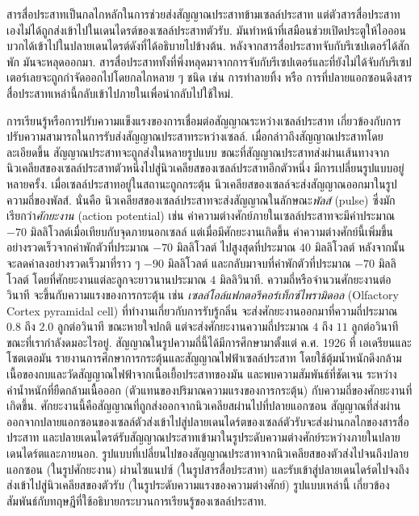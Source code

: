 {\begin{shaded}
		สารสื่อประสาทเป็นกลไกหลักในการช่วยส่งสัญญาณประสาทข้ามเซลล์ประสาท
		แต่ตัวสารสื่อประสาทเองไม่ได้ถูกส่งเข้าไปในเดนไดรต์ของเซลล์ประสาทตัวรับ.
		มันทำหน้าที่เสมือนช่วยเปิดประตูให้ไอออนบวกได้เข้าไปในปลายเดนไดรต์ดังที่ได้อธิบายไปข้างต้น.
		หลังจากสารสื่อประสาทจับกับรีเซปเตอร์ได้สักพัก มันจะหลุดออกมา.
		สารสื่อประสาททั้งที่พึ่งหลุดมาจากการจับกับรีเซปเตอร์และที่ยังไม่ได้จับกับรีเซปเตอร์เลยจะถูกกำจัดออกไปโดยกลไกหลาย ๆ ชนิด เช่น การทำลายทิ้ง หรือ การที่ปลายแอกซอนดึงสารสื่อประสาทเหล่านี้กลับเข้าไปภายในเพื่อนำกลับไปใช้ใหม่.
		
		การเรียนรู้หรือการปรับความแข็งแรงของการเชื่อมต่อสัญญาณระหว่างเซลล์ประสาท
		เกี่ยวข้องกับการปรับความสามารถในการรับส่งสัญญาณประสาทระหว่างเซลล์.
		เมื่อกล่าวถึงสัญญาณประสาทโดยละเอียดขึ้น 
		สัญญาณประสาทจะถูกส่งในหลายรูปแบบ ขณะที่สัญญาณประสาทส่งผ่านเส้นทางจากนิวเคลียสของเซลล์ประสาทตัวหนึ่งไปสู่นิวเคลียสของเซลล์ประสาทอีกตัวหนึ่ง
		มีการเปลี่ยนรูปแบบอยู่หลายครั้ง.
		เมื่อเซลล์ประสาทอยู่ในสถานะถูกกระตุ้น นิวเคลียสของเซลล์จะส่งสัญญาณออกมาในรูปความถี่ของพัลส์.
		นั่นคือ นิวเคลียสของเซลล์ประสาทจะส่งสัญญาณในลักษณะ\textit{พัลส์} (pulse) ซึ่งมักเรียกว่า\textit{ศักยะงาน} (action potential) 
		เช่น ค่าความต่างศักย์ภายในเซลล์ประสาทจะมีค่าประมาณ $-70$ มิลลิโวลต์เมื่อเทียบกับจุดภายนอกเซลล์
		แต่เมื่อมีศักยะงานเกิดขึ้น ค่าความต่างศักย์นี้เพิ่มขึ้นอย่างรวดเร็วจากค่าพักตัวที่ประมาณ $-70$ มิลลิโวลต์
		ไปสูงสุดที่ประมาณ $40$ มิลลิโวลต์ หลังจากนั้นจะลดค่าลงอย่างรวดเร็วมาที่ราว ๆ $-90$ มิลลิโวลต์ และกลับมาจบที่ค่าพักตัวที่ประมาณ $-70$ มิลลิโวลต์
		โดยที่ศักยะงานแต่ละลูกจะยาวนานประมาณ $4$ มิลลิวินาที.
		ความถี่หรือจำนวนศักยะงานต่อวินาที จะขึ้นกับความแรงของการกระตุ้น 
		เช่น \textit{เซลล์โอล์แฟกตอรีคอร์เท็กซ์ไพรามิดอล} (Olfactory Cortex pyramidal cell) ที่ทำงานเกี่ยวกับการรับรู้กลิ่น จะส่งศักยะงานออกมาที่ความถี่ประมาณ $0.8$ ถึง $2.0$ ลูกต่อวินาที ขณะหายใจปกติ 
		แต่จะส่งศักยะงานความถี่ประมาณ $4$ ถึง $11$ ลูกต่อวินาที ขณะที่เรากำลังดมอะไรอยู่\cite{NeuroBank}.
		สัญญาณในรูปความถี่นี้ได้มีการศึกษามาตั้งแต่ ค.ศ. 1926 ที่ เอเดรียนและโซตเตอมัน\cite{AdrianZotterman1926a}
		รายงานการศึกษาการกระตุ้นและสัญญาณไฟฟ้าเซลล์ประสาท
		โดยใช้ตุ้มน้ำหนักดึงกล้ามเนื้อของกบและวัดสัญญาณไฟฟ้าจากเนื้อเยื้อประสาทของมัน
		และพบความสัมพันธ์ที่ชัดเจน ระหว่างค่าน้ำหนักที่ยืดกล้ามเนื้อออก (ตัวแทนของปริมาณความแรงของการกระตุ้น)
		กับความถี่ของศักยะงานที่เกิดขึ้น.
		ศักยะงานนี้คือสัญญาณที่ถูกส่งออกจากนิวเคลียสผ่านไปที่ปลายแอกซอน
		สัญญาณที่ส่งผ่านออกจากปลายแอกซอนของเซลล์ตัวส่งเข้าไปสู่ปลายเดนไดร์ตของเซลล์ตัวรับจะส่งผ่านกลไกของสารสื่อประสาท
		และปลายเดนไดรต์รับสัญญาณประสาทเข้ามาในรูประดับความต่างศักย์ระหว่างภายในปลายเดนไดร์ตและภายนอก.
		รูปแบบที่เปลี่ยนไปของสัญญาณประสาทจากนิวเคลียสของตัวส่งไปจนถึงปลายแอกซอน (ในรูปศักยะงาน) ผ่านไซแนปซ์ (ในรูปสารสื่อประสาท) และรับเข้าสู่ปลายเดนไดร์ตไปจงถึงส่งเข้าไปสู่นิวเคลียสของตัวรับ (ในรูประดับความแรงของความต่างศักย์) รูปแบบเหล่านี้ เกี่ยวข้องสัมพันธ์กับทฤษฎีที่ใช้อธิบายกระบวนการเรียนรู้ของเซลล์ประสาท.
		

\end{shaded}}
